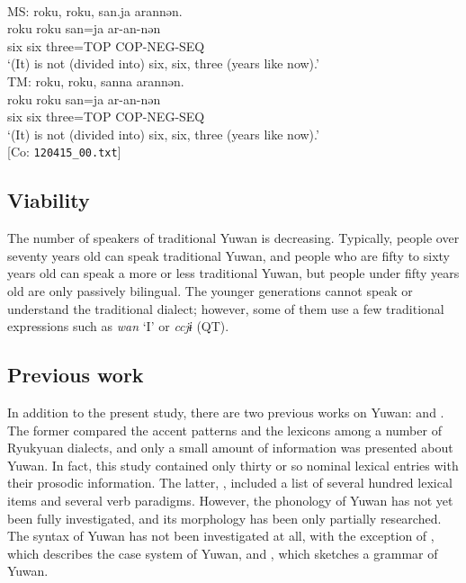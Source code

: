 \ea\label{ex:key:1}\\
MS: \glll {\textbar}roku, roku, san{\textbar}.ja arannən.\\
 roku roku san=ja ar-an-nən\\
 six six three=TOP COP-NEG-SEQ\\
\glt{} ‘(It) is not (divided into) six, six, three (years like now).’\\
TM: \glll {\textbar}roku, roku, san{\textbar}na arannən.\\
 roku roku san=ja ar-an-nən\\
 six six three=TOP COP-NEG-SEQ\\
\glt{} ‘(It) is not (divided into) six, six, three (years like now).’\\ [Co: \texttt{120415\_00.txt}]
\z

\subsection{Viability}
\hypertarget{RefHeadingToc395696956}{}
The number of speakers of traditional Yuwan is decreasing. Typically, people over seventy years old can speak traditional Yuwan, and people who are fifty to sixty years old can speak a more or less traditional Yuwan, but people under fifty years old are only passively bilingual. The younger generations cannot speak or understand the traditional dialect; however, some of them use a few traditional expressions such as \textit{wan} ‘I’ or \textit{ccjɨ} (QT).

\subsection{Previous work}
\hypertarget{RefHeadingToc395696957}{}
In addition to the present study, there are two previous works on Yuwan: \citet{HirayamaEtAl1966} and \citet{UchimaEtAl1976}. The former compared the accent patterns and the lexicons among a number of Ryukyuan dialects, and only a small amount of information was presented about Yuwan. In fact, this study contained only thirty or so nominal lexical entries with their prosodic information. The latter, \citet{UchimaEtAl1976}, included a list of several hundred lexical items and several verb paradigms. However, the phonology of Yuwan has not yet been fully investigated, and its morphology has been only partially researched. The syntax of Yuwan has not been investigated at all, with the exception of \citet{Niinaga2008}, which describes the case system of Yuwan, and \citet{Niinaga2010}, which sketches a grammar of Yuwan.

